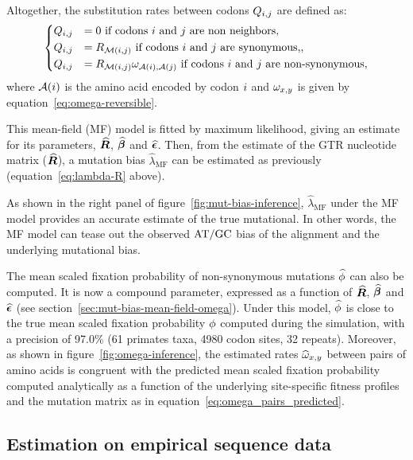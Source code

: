 \documentclass{article}
\begin{document}
Altogether, the {substitution} rates between codons $Q_{{i}, {j}}$ are defined as:
\begin{equation}
 \begin{dcases}
 Q_{{i}, {j}} & = 0 \text{ if codons ${i}$ and ${j}$ are non neighbors}, \\
 Q_{{i}, {j}} & = R_{\mathcal{M}({i}, {j})} \text{ if codons ${i}$ and ${j}$ are {synonymous},}, \\
 Q_{{i}, {j}} & = R_{\mathcal{M}({i}, {j})} \omega_{\mathcal{A}({i}), \mathcal{A}({j})} \text{ if codons ${i}$ and ${j}$ are non-synonymous},
 \end{dcases}
 \label{eq:codon-mean-field}
\end{equation}
where $\mathcal{A}({i})$ is the amino acid encoded by codon ${i}$ and $\omega_{x, y}$ is given by equation~\ref{eq:omega-reversible}.

This mean-field ({MF}) model is fitted by maximum {likelihood}, giving an estimate for its parameters, $\widehat{\bm{R}}$, $\widehat{\bm{\beta}}$ and $\widehat{\bm{\epsilon}}$.
Then, from the estimate of the {GTR} nucleotide matrix ($\widehat{\bm{R}}$), a mutation bias $\widehat{\lambda}_{\text{{MF}}}$ can be estimated as previously (equation~\ref{eq:lambda-R} above).

As shown in the right panel of figure~\ref{fig:mut-bias-inference}, $\widehat{\lambda}_{\text{{MF}}}$ under the {MF} model provides an accurate estimate of the true mutational.
In other words, the {MF} model can tease out the observed $\text{AT/GC}$ bias of the alignment and the underlying mutational bias.

The mean scaled fixation probability of {non-synonymous} mutations $\widehat{\phi}$ can also be computed.
It is now a compound parameter, expressed as a function of $\widehat{\bm{R}}$, $\widehat{\bm{\beta}}$ and $\widehat{\bm{\epsilon}}$ (see section~\ref{sec:mut-bias-mean-field-omega}).
Under this model, $\widehat{\phi}$ is close to the true mean scaled fixation probability $\phi$ computed during the simulation, with a precision of 97.0\% (61 primates taxa, 4980 codon sites, 32 repeats).
Moreover, as shown in figure~\ref{fig:omega-inference}, the estimated rates $\widehat{\omega}_{x, y}$ between pairs of amino acids is congruent with the predicted mean scaled fixation probability computed analytically as a function of the underlying site-specific fitness profiles and the mutation matrix as in equation~\ref{eq:omega_pairs_predicted}.

\subsection{Estimation on empirical sequence data}
\label{subsec:estimation-of-empirical-sequence-data}
\end{document}
